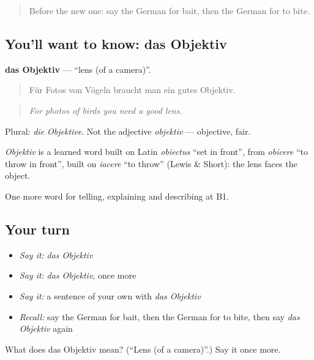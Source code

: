 \begin{quote}
Before the new one: say the German for bait, then the German for to bite.
\end{quote}

\subsection*{You'll want to know: das Objektiv}
\textbf{das Objektiv} — \textquotedblleft{}lens (of a camera)\textquotedblright{}.

\begin{quote}
Für Fotos von Vögeln braucht man ein gutes Objektiv.
\end{quote}

\begin{quote}
\emph{For photos of birds you need a good lens.}
\end{quote}

Plural: \emph{die Objektive}. Not the adjective \emph{objektiv} — objective, fair.

\begin{cousinweb}
\emph{Objektiv} is a learned word built on Latin \emph{obiectus} \textquotedblleft{}set in front\textquotedblright{}, from \emph{obicere} \textquotedblleft{}to throw in front\textquotedblright{}, built on \emph{iacere} \textquotedblleft{}to throw\textquotedblright{} (Lewis \& Short): the lens faces the object.
\end{cousinweb}

\begin{grammarlens}[title={What you've built}]
One more word for telling, explaining and describing at B1.
\end{grammarlens}

\subsection*{Your turn}
\begin{itemize}
\raggedright
  \item \emph{Say it:} \emph{das Objektiv}
  \item \emph{Say it:} \emph{das Objektiv}, once more
  \item \emph{Say it:} a sentence of your own with \emph{das Objektiv}
  \item \emph{Recall:} say the German for bait, then the German for to bite, then say \emph{das Objektiv} again
\end{itemize}

\begin{tcolorbox}[breakable,colback=teal!4,colframe=teal!35!black,title={Before you move on}]
What does das Objektiv mean? (\textquotedblleft{}Lens (of a camera)\textquotedblright{}.) Say it once more.
\end{tcolorbox}

